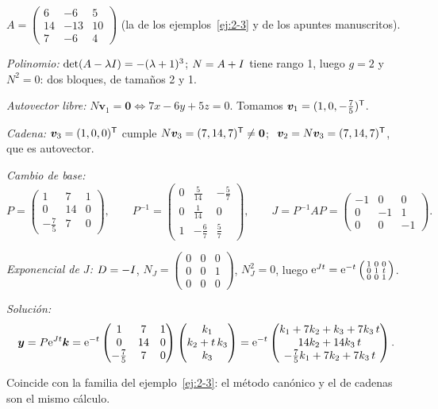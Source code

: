\documentclass[11pt,twoside]{article}
\newcommand\vy{\bm{y}}
\newcommand\vv{\bm{v}}
\newcommand\vk{\bm{k}}
\newcommand\mat[1]{\begin{pmatrix}#1\end{pmatrix}}
\newcommand\smat[1]{\left(\begin{smallmatrix}#1\end{smallmatrix}\right)}
\begin{document}
\begin{ejemplo}[raíz triple con $g=2$]\label{ej:4-2}
$A=\smat{6&-6&5\\14&-13&10\\7&-6&4}$ (la de los ejemplos~\ref{ej:2-3} y de los apuntes manuscritos).
\begin{pasos}
\item \emph{Polinomio:} $\det(A-\lambda I)=-(\lambda+1)^3$; $N=A+I$ tiene rango 1, luego $g=2$ y $N^2=0$:
dos bloques, de tamaños 2 y 1.
\item \emph{Autovector libre:} $N\vv_1=\bm0\iff7x-6y+5z=0$. Tomamos $\vv_1=(1,0,-\tfrac75)\T$.
\item \emph{Cadena:} $\vv_3=(1,0,0)\T$ cumple $N\vv_3=(7,14,7)\T\neq\bm0$; $\ \vv_2=N\vv_3=(7,14,7)\T$, que es autovector.
\item \emph{Cambio de base:}
\begin{equation*}
P=\mat{1&7&1\\0&14&0\\-\tfrac75&7&0},\qquad
P^{-1}=\mat{0&\tfrac5{14}&-\tfrac57\\0&\tfrac1{14}&0\\1&-\tfrac67&\tfrac57},\qquad
J=P^{-1}AP=\mat{-1&0&0\\0&-1&1\\0&0&-1}.
\end{equation*}
\item \emph{Exponencial de $J$:} $D=-I$, $N_J=\smat{0&0&0\\0&0&1\\0&0&0}$, $N_J^2=0$, luego
$\e^{Jt}=\e^{-t}\smat{1&0&0\\0&1&t\\0&0&1}$.
\item \emph{Solución:}
\begin{equation*}
\vy=P\e^{Jt}\vk=\e^{-t}\mat{1&7&1\\0&14&0\\-\tfrac75&7&0}\mat{k_1\\k_2+t\,k_3\\k_3}
=\e^{-t}\mat{k_1+7k_2+k_3+7k_3\,t\\ 14k_2+14k_3\,t\\ -\tfrac75k_1+7k_2+7k_3\,t}.
\end{equation*}
\end{pasos}
Coincide con la familia del ejemplo~\ref{ej:2-3}: el método canónico y el de cadenas son el mismo cálculo.
\end{ejemplo}
\end{document}

